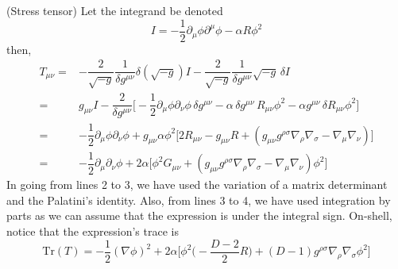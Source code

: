 
\usepackage{cancel}
\usepackage{tikz}
\usetikzlibrary{positioning}
\usetikzlibrary{shapes}

\title{}
\author{Dane Jeon}


\begin{ex}
(Stress tensor) Let the integrand be denoted 
\[I=-\dfrac{1}{2}\partial _{\mu }\phi \partial ^{\mu }\phi -\alpha R\phi ^2\]
then,
\[\begin{align*}
T_{\mu \nu }=&-\dfrac{2}{\sqrt{-g}}\dfrac{1}{\delta g^{\mu \nu }}\delta (\sqrt{-g})I-\dfrac{2}{\sqrt{-g}}\dfrac{1}{\delta g^{\mu \nu }}\sqrt{-g}\,\delta I\\
=&g_{\mu \nu }I-\dfrac{2}{\delta g^{\mu \nu }}\Big[-\dfrac{1}{2}\partial _{\mu }\phi \partial _{\nu }\phi\,\delta g^{\mu \nu } -\alpha \,\delta g^{\mu \nu }\,R_{\mu \nu }\phi ^2-\alpha g^{\mu \nu }\,\delta R_{\mu \nu }\phi ^2\Big]\\
=&-\dfrac{1}{2}\partial _{\mu }\phi \partial_{\nu }\phi +g_{\mu \nu }\alpha \phi ^2\Big[2R_{\mu \nu }-g_{\mu \nu }R+(g_{\mu \nu }g^{\rho \sigma }\nabla _{\rho }\nabla _{\sigma }-\nabla _{\mu }\nabla _{\nu })\Big]\\
=&-\dfrac{1}{2}\partial _{\mu }\partial _{\nu }\phi +2\alpha \Big[\phi ^2G_{\mu \nu }+(g_{\mu \nu }g^{\rho \sigma }\nabla _{\rho }\nabla _{\sigma }-\nabla _{\mu }\nabla _{\nu })\phi ^2\Big]
\end{align*}\]
In going from lines 2 to 3, we have used the variation of a matrix determinant and the Palatini's identity. Also, from lines 3 to 4, we have used integration by parts as we can assume that the expression is under the integral sign. On-shell, notice that the expression's trace is
\[\mathrm{Tr}(T)=-\dfrac{1}{2}(\nabla \phi )^2+2\alpha \Big[\phi ^2\Big(-\dfrac{D-2}{2}R\Big)+(D-1)g^{\rho \sigma }\nabla _{\rho }\nabla _{\sigma }\phi ^2\Big]\]

\end{ex}
\vspace{2ex}

